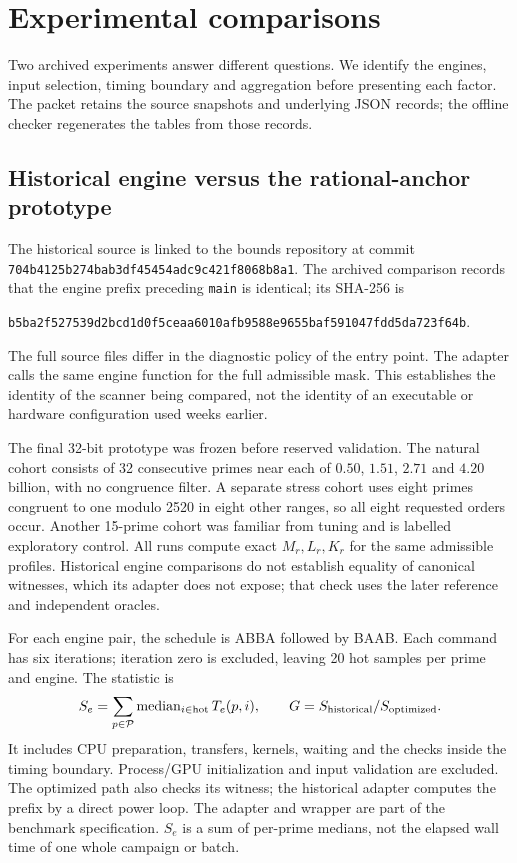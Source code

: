 \documentclass[11pt]{article}
\theoremstyle{definition}\newtheorem{remark}[theorem]{Remark}
\begin{document}
\section{Experimental comparisons}\label{sec:experiments}
Two archived experiments answer different questions. We identify the
engines, input selection, timing boundary and aggregation before presenting
each factor. The packet retains the source snapshots and underlying JSON
records; the offline checker regenerates the tables from those records.

\subsection{Historical engine versus the rational-anchor prototype}
The historical source is linked to the bounds repository at commit
\nolinkurl{704b4125b274bab3df45454adc9c421f8068b8a1}.
The archived comparison records that the engine prefix preceding
\texttt{main} is identical; its SHA-256 is
\begin{center}\footnotesize
\nolinkurl{b5ba2f527539d2bcd1d0f5ceaa6010afb9588e9655baf591047fdd5da723f64b}.
\end{center}
The full source files differ in the diagnostic policy of the entry point.
The adapter calls the same engine function for the full admissible mask.
This establishes the identity of the scanner being compared, not the
identity of an executable or hardware configuration used weeks earlier.

The final 32-bit prototype was frozen before reserved validation. The
natural cohort consists of 32 consecutive primes near each of $0.50$,
$1.51$, $2.71$ and $4.20$ billion, with no congruence filter. A separate
stress cohort uses eight primes congruent to one modulo 2520 in eight
other ranges, so all eight requested orders occur. Another 15-prime cohort
was familiar from tuning and is labelled exploratory control. All runs
compute exact $M_r,L_r,K_r$ for the same admissible profiles. Historical
engine comparisons do not establish equality of canonical witnesses,
which its adapter does not expose; that check uses the later reference
and independent oracles.

For each engine pair, the schedule is ABBA followed by BAAB. Each command
has six iterations; iteration zero is excluded, leaving 20 hot samples per
prime and engine. The statistic is
\begin{equation}\label{eq:medians}
 S_e=\sum_{p\in\mathcal P}\operatorname{median}_{i\in\mathrm{hot}}T_e(p,i),
 \qquad G=S_{\rm historical}/S_{\rm optimized}.
\end{equation}
It includes CPU preparation, transfers, kernels, waiting and the checks
inside the timing boundary. Process/GPU initialization and input validation
are excluded. The optimized path also checks its witness; the historical
adapter computes the prefix by a direct power loop. The adapter and wrapper
are part of the benchmark specification. $S_e$ is a sum of per-prime medians,
not the elapsed wall time of one whole campaign or batch.
\end{document}
